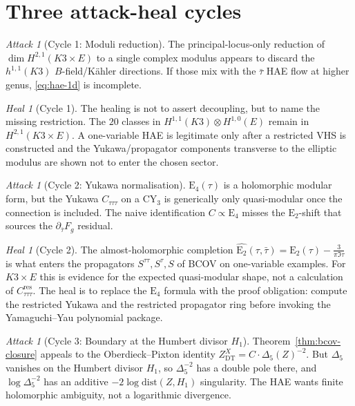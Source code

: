 \documentclass[11pt]{article}
\theoremstyle{plain}
\theoremstyle{definition}
\theoremstyle{remark}
\newtheorem{attack}[theorem]{Attack}
\newtheorem{heal}[theorem]{Heal}
\providecommand{\Eis}{\mathrm{E}}
\begin{document}
\section{Three attack-heal cycles}
\label{sec:attack-heal}

\begin{attack}[Cycle 1: Moduli reduction]
The principal-locus-only reduction of \(\dim H^{2,1}(K3\times E)\) to a
single complex modulus appears to discard the $h^{1,1}(K3)$
$B$-field/K\"ahler directions. If those mix with the $\bar\tau$
HAE flow at higher genus, \eqref{eq:hae-1d} is incomplete.
\end{attack}

\begin{heal}[Cycle 1]
The healing is not to assert decoupling, but to name the missing
restriction. The $20$ classes in
$H^{1,1}(K3)\otimes H^{1,0}(E)$ remain in $H^{2,1}(K3\times E)$.
A one-variable HAE is legitimate only after a restricted VHS is
constructed and the Yukawa/propagator components transverse to the
elliptic modulus are shown not to enter the chosen sector.
\end{heal}

\begin{attack}[Cycle 2: Yukawa normalisation]
$\Eis_4(\tau)$ is a holomorphic modular form, but the Yukawa
$C_{\tau\tau\tau}$ on a CY$_3$ is generically only quasi-modular
once the connection is included. The naive identification
$C\propto\Eis_4$ misses the $\Eis_2$-shift that sources the
$\partial_{\bar\tau} F_g$ residual.
\end{attack}

\begin{heal}[Cycle 2]
The almost-holomorphic completion $\widehat{\Eis_2}(\tau, \bar\tau) =
\Eis_2(\tau) - \tfrac{3}{\pi\Im\tau}$ is what enters the propagators
$S^{\tau\tau}, S^\tau, S$ of BCOV on one-variable examples. For
$K3\times E$ this is evidence for the expected quasi-modular shape,
not a calculation of $C_{\tau\tau\tau}^{\mathrm{res}}$. The heal is to
replace the $\Eis_4$ formula with the proof obligation: compute the
restricted Yukawa and the restricted propagator ring before invoking
the Yamaguchi--Yau polynomial package.
\end{heal}

\begin{attack}[Cycle 3: Boundary at the Humbert divisor $H_1$]
Theorem~\ref{thm:bcov-closure} appeals to the Oberdieck--Pixton
identity $Z^X_{\mathrm{DT}}=C\cdot\Delta_5(Z)^{-2}$. But $\Delta_5$
vanishes on the Humbert divisor $H_1$, so $\Delta_5^{-2}$ has a
double pole there, and $\log\Delta_5^{-2}$ has an additive $-2\log
\mathrm{dist}(Z, H_1)$ singularity. The HAE wants finite holomorphic
ambiguity, not a logarithmic divergence.
\end{attack}
\end{document}
